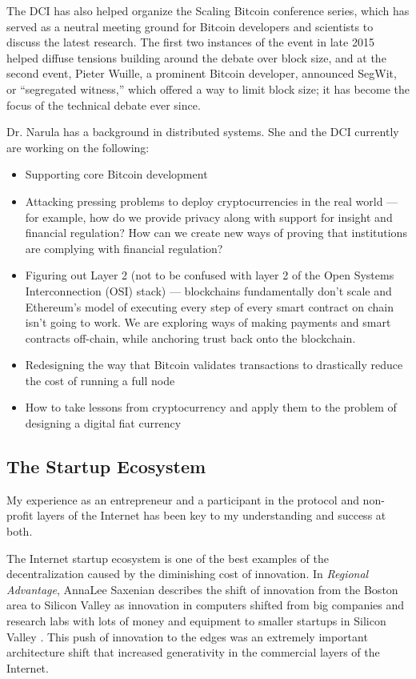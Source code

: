 The \ac{DCI} has also helped organize the Scaling Bitcoin conference series, which has served as a neutral meeting ground for Bitcoin developers and scientists to discuss the latest research. The first two instances of the event in late 2015 helped diffuse tensions building around the debate over block size, and at the second event, Pieter Wuille, a prominent Bitcoin developer, announced SegWit, or ``segregated witness,'' which offered a way to limit block size; it has become the focus of the technical debate ever since.

Dr. Narula has a background in distributed systems. She and the \ac{DCI} currently are working on the following:

\begin{itemize}
\item Supporting core Bitcoin development
\item Attacking pressing problems to deploy cryptocurrencies in the real world --- for example, how do we provide privacy along with support for insight and financial regulation? How can we create new ways of proving that institutions are complying with financial regulation?
\item Figuring out Layer 2 (not to be confused with layer 2 of the Open Systems Interconnection (OSI) stack) --- blockchains fundamentally don't scale and Ethereum's model of executing every step of every smart contract on chain isn't going to work. We are exploring ways of making payments and smart contracts off-chain, while anchoring trust back onto the blockchain.
\item Redesigning the way that Bitcoin validates transactions to drastically reduce the cost of running a full node 
\item How to take lessons from cryptocurrency and apply them to the problem of designing a digital fiat currency
\end{itemize}

\subsection{The Startup Ecosystem}

My experience as an entrepreneur and a participant in the protocol and non-profit layers of the Internet has been key to my understanding and success at both. 

The Internet startup ecosystem is one of the best examples of the decentralization caused by the diminishing cost of innovation. In \textit{Regional Advantage}, AnnaLee Saxenian describes the shift of innovation from the Boston area to Silicon Valley as innovation in computers shifted from big companies and research labs with lots of money and equipment to smaller startups in Silicon Valley \cite{saxenian1996regional}. This push of innovation to the edges was an extremely important architecture shift that increased generativity in the commercial layers of the Internet. 

